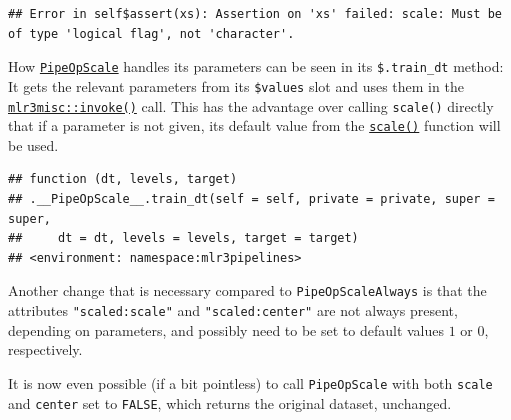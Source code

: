 \documentclass[
]{scrbook}
\newenvironment{Shaded}{\begin{snugshade}}{\end{snugshade}}
\newcommand{\ConstantTok}[1]{\textcolor[rgb]{0.00,0.00,0.00}{#1}}
\newcommand{\DecValTok}[1]{\textcolor[rgb]{0.00,0.00,0.81}{#1}}
\newcommand{\FunctionTok}[1]{\textcolor[rgb]{0.00,0.00,0.00}{#1}}
\newcommand{\NormalTok}[1]{#1}
\newcommand{\OtherTok}[1]{\textcolor[rgb]{0.56,0.35,0.01}{#1}}
\newcommand{\SpecialCharTok}[1]{\textcolor[rgb]{0.00,0.00,0.00}{#1}}
\renewenvironment{Shaded} {\begin{snugshade}\small} {\end{snugshade}}
\begin{document}
\begin{verbatim}
## Error in self$assert(xs): Assertion on 'xs' failed: scale: Must be of type 'logical flag', not 'character'.
\end{verbatim}

How \href{https://mlr3pipelines.mlr-org.com/reference/mlr_pipeops_scale.html}{\texttt{PipeOpScale}} handles its parameters can be seen in its \texttt{\$.train\_dt} method: It gets the relevant parameters from its \texttt{\$values} slot and uses them in the \href{https://mlr3misc.mlr-org.com/reference/invoke.html}{\texttt{mlr3misc::invoke()}} call.
This has the advantage over calling \texttt{scale()} directly that if a parameter is not given, its default value from the \href{https://www.rdocumentation.org/packages/base/topics/scale}{\texttt{scale()}} function will be used.

\begin{Shaded}
\end{Shaded}

\begin{verbatim}
## function (dt, levels, target) 
## .__PipeOpScale__.train_dt(self = self, private = private, super = super, 
##     dt = dt, levels = levels, target = target)
## <environment: namespace:mlr3pipelines>
\end{verbatim}

Another change that is necessary compared to \texttt{PipeOpScaleAlways} is that the attributes \texttt{"scaled:scale"} and \texttt{"scaled:center"} are not always present, depending on parameters, and possibly need to be set to default values \(1\) or \(0\), respectively.

It is now even possible (if a bit pointless) to call \texttt{PipeOpScale} with both \texttt{scale} and \texttt{center} set to \texttt{FALSE}, which returns the original dataset, unchanged.

\begin{Shaded}
\end{Shaded}
\end{document}
